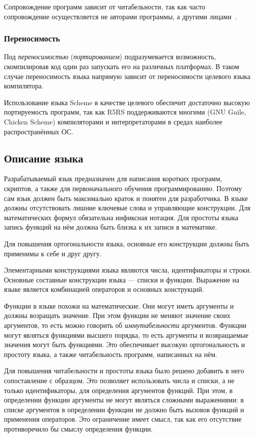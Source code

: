             Сопровождение программ зависит от читабельности, так как часто сопровождение осуществляется не авторами программы, а другими лицами~\cite{langs}.
        \subsubsection{Переносимость}
            Под \textit{переносимостью} (\textit{портированием}) подразумевается возможность, скомпилировав код один раз запускать его на различных платформах.
            В таком случае переносимость языка напрямую зависит от переносимости целевого языка компилятора.
    
            Использование языка Scheme в качестве целевого обеспечит достаточно высокую портируемость программ, так как R5RS поддерживаются многими (GNU Guile, Chicken Scheme) компиляторами и интерпретаторами в средах наиболее распространённых ОС.
    \subsection{Описание языка}
        Разрабатываемый язык предназначен для написания коротких программ, скриптов, а также для первоначального обучения программированию.
        Поэтому сам язык должен быть максимально краток и понятен для разработчика.
        В языке должны отсутствовать лишние ключевые слова и управляющие конструкции.
        Для математических формул обязательна инфиксная нотация.
        Для простоты языка запись функций на нём должна быть близка к их записи в математике.

        Для повышения ортогональности языка, основные его конструкции должны быть применимы к себе и друг другу.

        Элементарными конструкциями языка являются числа, идентификаторы и строки.
        Основные составные конструкции языка --- списки и функции.
        Выражение на языке является комбинацией операторов и основных конструкций.

        Функции в языке похожи на математические.
        Они могут иметь аргументы и должны возращать значение.
        При этом функции не меняют значение своих аргументов, то есть можно говорить об \textit{иммутабельности} аргументов.
        Функции могут являться функциями высшего порядка, то есть аргументы и возвращаемые значения могут быть функциями.
        Это обеспечивает высокую ортогональность и простоту языка, а также читабельность программ, написанных на нём.

        Для повышения читабельности и простоты языка было решено добавить в него сопоставление с образцом.
        Это позволяет использовать числа и списки, а не только идентификаторы, для определения аргументов функций.
        При этом, в определении функции аргументы не могут являться сложными выражениями: в списке аргументов в определении функции не должно быть вызовов функций и применения операторов.
        Это ограничение имеет смысл, так как его отсутствие противоречило бы смыслу определения функции.

